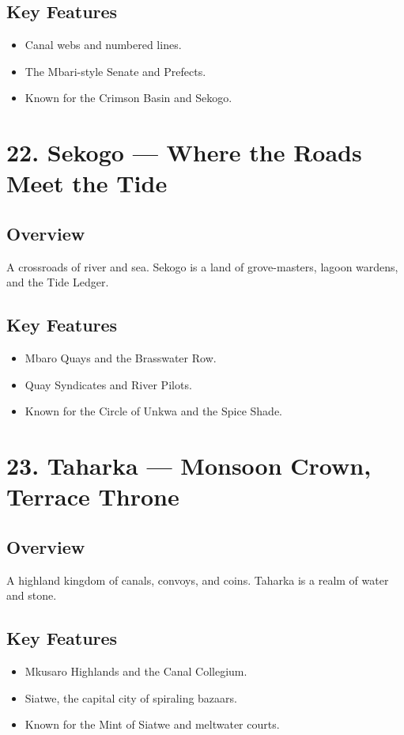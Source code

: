 \documentclass[11pt]{article}
\begin{document}
\subsection*{Key Features}
\begin{itemize}[leftmargin=*]
    \item Canal webs and numbered lines.
    \item The Mbari-style Senate and Prefects.
    \item Known for the Crimson Basin and Sekogo.
\end{itemize}

\section*{22. Sekogo — Where the Roads Meet the Tide}

\subsection*{Overview}
A crossroads of river and sea. Sekogo is a land of grove-masters, lagoon wardens, and the Tide Ledger.

\subsection*{Key Features}
\begin{itemize}[leftmargin=*]
    \item Mbaro Quays and the Brasswater Row.
    \item Quay Syndicates and River Pilots.
    \item Known for the Circle of Unkwa and the Spice Shade.
\end{itemize}

\section*{23. Taharka — Monsoon Crown, Terrace Throne}

\subsection*{Overview}
A highland kingdom of canals, convoys, and coins. Taharka is a realm of water and stone.

\subsection*{Key Features}
\begin{itemize}[leftmargin=*]
    \item Mkusaro Highlands and the Canal Collegium.
    \item Siatwe, the capital city of spiraling bazaars.
    \item Known for the Mint of Siatwe and meltwater courts.
\end{itemize}
\end{document}
